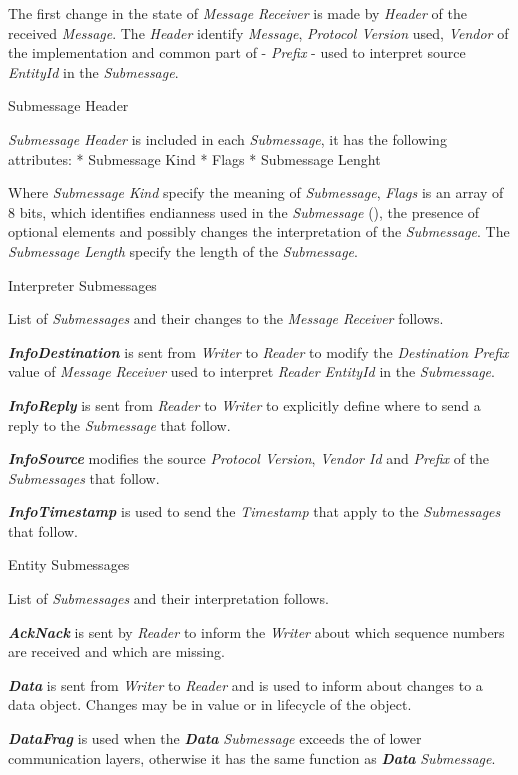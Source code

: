 The first change in the state of {\em Message Receiver} is made by {\em Header} of the received {\em Message}. The {\em Header} identify  {\em Message}, {\em Protocol Version} used, {\em Vendor} of the implementation and common part of  - {\em {} Prefix} - used to interpret source {\em EntityId} in the {\em Submessage}.

\secc Submessage Header

{\em Submessage Header} is included in each {\em Submessage}, it has the following attributes:
\begitems
* Submessage Kind
* Flags
* Submessage Lenght
\enditems

Where {\em Submessage Kind} specify the meaning of {\em Submessage}, {\em Flags} is an array of 8 bits, which identifies endianness used in the {\em Submessage} (), the presence of optional elements and possibly changes the interpretation of the {\em Submessage}. The {\em Submessage Length} specify the length of the {\em Submessage}.

\secc Interpreter Submessages

List of {\em Submessages} and their changes to the {\em Message Receiver} follows.

{\em\bf InfoDestination} is sent from {\em Writer} to {\em Reader} to modify the {\em Destination  Prefix} value of {\em Message Receiver} used to interpret {\em Reader} {\em EntityId} in the {\em Submessage}.

{\em\bf InfoReply} is sent from {\em Reader} to {\em Writer} to explicitly define where to send a reply to the {\em Submessage} that follow.

{\em\bf InfoSource} modifies the source {\em Protocol Version}, {\em Vendor Id} and {\em {} Prefix} of the {\em Submessages} that follow.

{\em\bf InfoTimestamp} is used to send the {\em Timestamp} that apply to the {\em Submessages} that follow.

\secc Entity Submessages

List of {\em Submessages} and their interpretation follows.

{\em\bf AckNack} is sent by {\em Reader} to inform the {\em Writer} about which sequence numbers are received and which are missing.

{\em\bf Data} is sent from {\em Writer} to {\em Reader} and is used to inform about changes to a data object. Changes may be in value or in lifecycle of the object.

{\em\bf DataFrag} is used when the {\em\bf Data} {\em Submessage} exceeds the  of lower communication layers, otherwise it has the same function as {\em\bf Data} {\em Submessage}.

